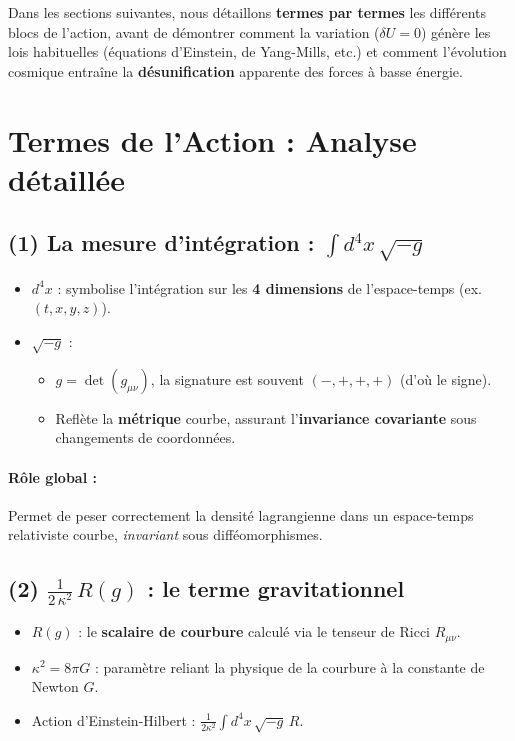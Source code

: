 \documentclass[12pt]{article}
\begin{document}
Dans les sections suivantes, nous d\'etaillons \textbf{termes par termes} 
les diff\'erents blocs de l'action, avant de d\'emontrer comment la variation 
(\(\delta U = 0\)) g\'en\`ere les lois habituelles (\'equations d'Einstein, de Yang-Mills, etc.) 
et comment l'\'evolution cosmique entra\^ine la \textbf{d\'esunification} apparente 
des forces \`a basse \'energie.

\section{Termes de l'Action : Analyse d\'etaill\'ee}

\subsection{(1) La mesure d’int\'egration : \(\displaystyle \int d^4 x \,\sqrt{-g}\)}

\begin{itemize}
\item \(\displaystyle d^4x\) : symbolise l'int\'egration sur les \textbf{4 dimensions} 
      de l'espace-temps (ex. \((t,x,y,z)\)). 
\item \(\sqrt{-g}\) : 
   \begin{itemize}
   \item \(g = \det(g_{\mu\nu})\), la signature est souvent \((-,+,+,+)\) (d'o\`u le signe).
   \item Refl\`ete la \textbf{m\'etrique} courbe, assurant l'\textbf{invariance covariante} 
         sous changements de coordonn\'ees.
   \end{itemize}
\end{itemize}
\paragraph{R\^ole global :} 
Permet de \og peser \fg{} correctement la densit\'e lagrangienne dans un espace-temps 
relativiste courbe, \emph{invariant} sous diff\'eomorphismes.

\subsection{(2) \(\displaystyle \frac{1}{2\,\kappa^2}\,R(g)\) : le terme gravitationnel}

\begin{itemize}
\item \(R(g)\) : le \textbf{scalaire de courbure} calcul\'e via 
      le tenseur de Ricci \(R_{\mu\nu}\).
\item \(\kappa^2 = 8\pi G\) : param\`etre reliant la physique de la courbure \`a la constante de Newton \(G\).
\item Action d'Einstein-Hilbert : \(\tfrac{1}{2\kappa^2}\int d^4x \,\sqrt{-g}\,R\).
\end{itemize}
\end{document}
